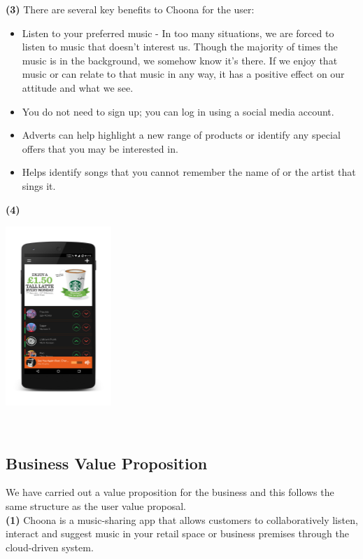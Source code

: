 \textbf{(3)} There are several key benefits to Choona for the user:
\begin{itemize}
\item Listen to your preferred music - In too many situations, we are forced to listen to music that doesn't interest us.  Though the majority of times the music is in the background, we somehow know it's there.  If we enjoy that music or can relate to that music in any way, it has a positive effect on our attitude and what we see.
\item You do not need to sign up; you can log in using a social media account.
\item Adverts can help highlight a new range of products or identify any special offers that you may be interested in.
\item Helps identify songs that you cannot remember the name of or the artist that sings it.
\end{itemize} 

\textbf{(4)}\\
\begin{minipage}{\linewidth}
\centering
\includegraphics[width=0.3\textwidth]{./img/idea_user_prop.png}
\label{fig:image_user_prop}
\end{minipage}\\

\subsection{Business Value Proposition}
We have carried out a value proposition for the business and this follows the same structure as the user value proposal.\\

\textbf{(1)} Choona is a music-sharing app that allows customers to collaboratively listen, interact and suggest music in your retail space or business premises through the cloud-driven system.  \\

